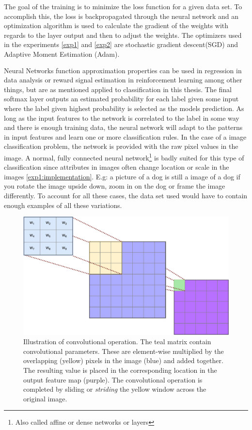 The goal of the training is to minimize the loss function for a given data set. To accomplish this, the loss is backpropagated through the neural network and an optimization algorithm is used to calculate the gradient of the weights with regards to the layer output and then to adjust the weights. The optimizers used in the experiments \ref{exp1} and \ref{exp2} are stochastic gradient descent(SGD)\cite{sgd} and Adaptive Moment Estimation (Adam)\cite{adam}. 

Neural Networks function approximation properties can be used in regression in data analysis or reward signal estimation in reinforcement learning among other things, but are as mentioned applied to classification in this thesis. 
The final softmax layer outputs an estimated probability for each label given some input where the label given highest probability is selected as the models prediction. As long as the input features to the network is correlated to the label in some way and there is enough training data, the neural network will adapt to the patterns in input features and learn one or more classification rules. In the case of a image classification problem, the network is provided with the raw pixel values in the image. A normal, fully connected neural network\footnote{Also called affine or dense networks or layers} is badly suited for this type of classification since attributes in images often change location or scale in the images \ref{exp1:implementation}. E.g: a picture of a dog is still a image of a dog if you rotate the image upside down, zoom in on the dog or frame the image differently. To account for all these cases, the data set used would have to contain enough examples of all these variations.
\begin{figure}[ht] 
    \centering
    \includegraphics[width=\linewidth]{Chapters/2.Background/figures/convolution.pdf}
    \caption{Illustration of convolutional operation. The teal matrix contain convolutional parameters. These are element-wise multiplied by the overlapping (yellow) pixels in the image (blue) and added together. The resulting value is placed in the corresponding location in the output feature map (purple). The convolutional operation is completed by sliding or \textit{striding} the yellow window across the original image.}
    \label{fig:conv}
\end{figure}
